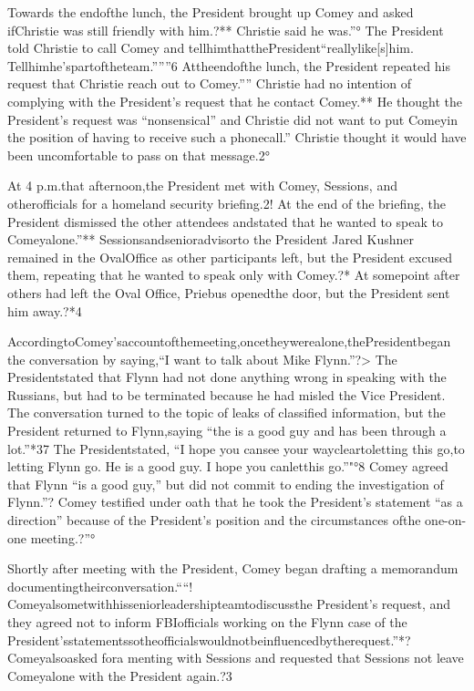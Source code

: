 Towards the endofthe lunch, the President brought up Comey and asked ifChristie was still friendly with him.?**
Christie said he was.”°
The President told Christie to call Comey and tellhimthatthePresident“reallylike[s]him. Tellhimhe’spartoftheteam.”””6
Attheendofthe lunch, the President repeated his request that Christie reach out to Comey.””
Christie had no intention of complying with the President’s request that he contact Comey.**
He thought the President’s request was “nonsensical” and Christie did not want to put Comeyin the position of having to receive such a phonecall.”
Christie thought it would have been uncomfortable to pass on that message.2°

At 4 p.m.that afternoon,the President met with Comey, Sessions, and otherofficials for a homeland security briefing.2!
At the end of the briefing, the President dismissed the other attendees andstated that he wanted to speak to Comeyalone.”**
Sessionsandsenioradvisorto the President Jared Kushner remained in the OvalOffice as other participants left, but the President excused them, repeating that he wanted to speak only with Comey.?*
At somepoint after others had left the Oval Office, Priebus openedthe door, but the President sent him away.?*4

AccordingtoComey’saccountofthemeeting,oncetheywerealone,thePresidentbegan the conversation by saying,“I want to talk about Mike Flynn.”?>
The Presidentstated that Flynn had not done anything wrong in speaking with the Russians, but had to be terminated because he had misled the Vice President.
The conversation turned to the topic of leaks of classified information, but the President returned to Flynn,saying “the is a good guy and has been through a lot.”*37
The Presidentstated, “I hope you cansee your waycleartoletting this go,to letting Flynn go.
He is a good guy.
I hope you canletthis go.”"°8
Comey agreed that Flynn “is a good guy,” but did not commit to ending the investigation of Flynn.”?
Comey testified under oath that he took the President’s statement “as a direction” because of the President’s position and the circumstances ofthe one-on-one meeting.?”°

Shortly after meeting with the President, Comey began drafting a memorandum documentingtheirconversation.““!
Comeyalsometwithhisseniorleadershipteamtodiscussthe President’s request, and they agreed not to inform FBIofficials working on the Flynn case of the President’sstatementssotheofficialswouldnotbeinfluencedbytherequest.”*?
Comeyalsoasked fora menting with Sessions and requested that Sessions not leave Comeyalone with the President again.?3


